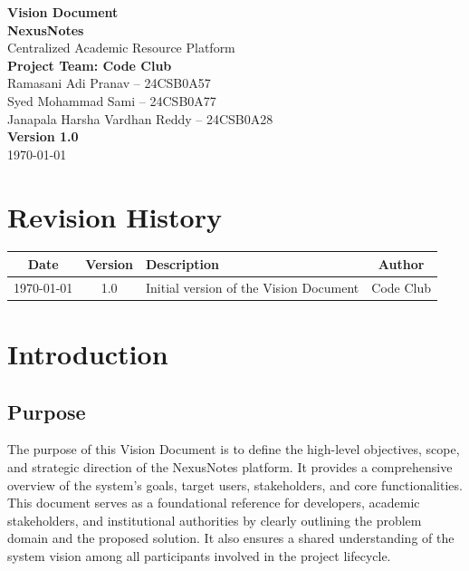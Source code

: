 \documentclass[12pt,a4paper]{report}
\begin{document}
\begin{titlepage}
    \centering
    \vspace*{2cm}
    
    {\Huge \textbf{Vision Document}}\\[0.5cm]
    {\Large \textbf{NexusNotes}}\\[0.5cm]
    {\large Centralized Academic Resource Platform}\\[2cm]
    
    \textbf{Project Team: Code Club}\\[0.5cm]
    Ramasani Adi Pranav -- 24CSB0A57\\
    Syed Mohammad Sami -- 24CSB0A77\\
    Janapala Harsha Vardhan Reddy -- 24CSB0A28\\[2cm]
    
    \vfill
    {\large \textbf{Version 1.0}}\\
    {\large \today}
    
\end{titlepage}

\newpage


\chapter*{Revision History}

\begin{longtable}{|c|c|p{7cm}|c|}
\hline
\textbf{Date} & \textbf{Version} & \textbf{Description} & \textbf{Author} \\
\hline
\today & 1.0 & Initial version of the Vision Document & Code Club \\
\hline
\end{longtable}

\newpage


\tableofcontents

\newpage


\chapter{Introduction}

\section{Purpose}
The purpose of this Vision Document is to define the high-level objectives, scope, and strategic direction of the NexusNotes platform. It provides a comprehensive overview of the system’s goals, target users, stakeholders, and core functionalities. This document serves as a foundational reference for developers, academic stakeholders, and institutional authorities by clearly outlining the problem domain and the proposed solution. It also ensures a shared understanding of the system vision among all participants involved in the project lifecycle.
\end{document}
